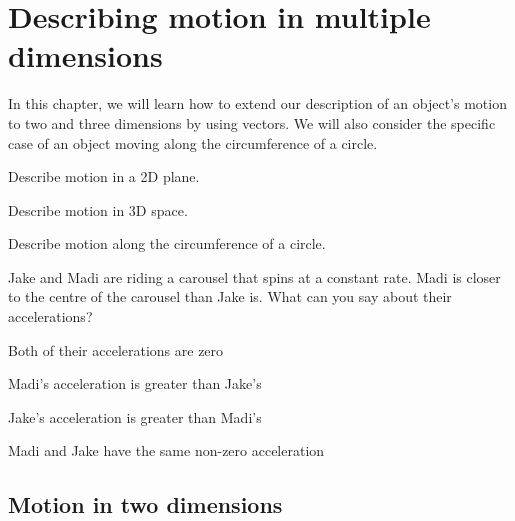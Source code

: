
\chapter{Describing motion in multiple dimensions}
\label{chapter:describingmotioninnd}
In this chapter, we will learn how to extend our description of an object's motion to two and three dimensions by using vectors. We will also consider the specific case of an object moving along the circumference of a circle. 

\begin{learningObjectives}{
 \item Describe motion in a 2D plane.
 \item Describe motion in 3D space.
 \item Describe motion along the circumference of a circle.}
\end{learningObjectives}

\begin{opening}
\begin{MCquestion}{Jake and Madi are riding a carousel that spins at a constant rate. Madi is closer to the centre of the carousel than Jake is. What can you say about their accelerations?}
\item Both of their accelerations are zero
\item Madi's acceleration is greater than Jake's
\item Jake's acceleration is greater than Madi's %
\item Madi and Jake have the same non-zero acceleration
\end{MCquestion}
\end{opening}

\section{Motion in two dimensions}

